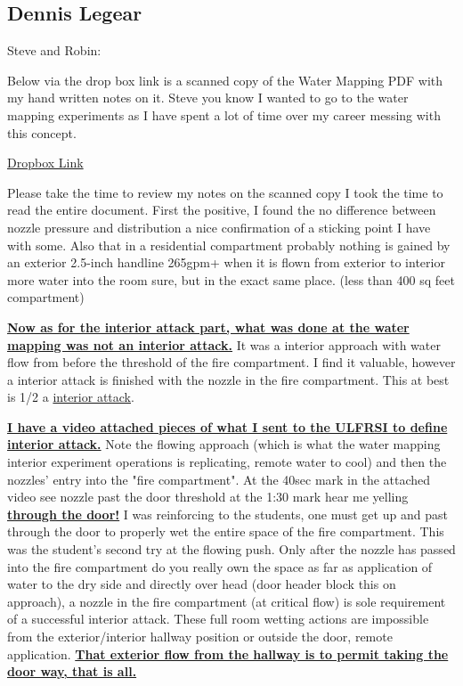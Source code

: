 \documentclass[12pt,oneside]{book}
\begin{document}
\begin{appendix}
\section{Dennis Legear}

Steve and Robin:

Below via the drop box link is a scanned copy of the Water Mapping PDF with my hand written notes on it. Steve you know I wanted to go to the water mapping experiments as I have spent a lot of time over my career messing with this concept.

\hyperlink{https://www.dropbox.com/sh/1wmpqxr2a5fow0c/AAB1bfG-yKjGBKFCOlRtaYDya?dl=0}{Dropbox Link}

Please take the time to review my notes on the scanned copy I took the time to read the entire document.  First the positive, I found the no difference between nozzle pressure and distribution a nice confirmation of a sticking point I have with some.  Also that in a residential compartment probably nothing is gained by an exterior 2.5-inch handline 265gpm+ when it is flown from exterior to interior more water into the room sure, but in the exact same place. (less than 400 sq feet compartment)

\textbf{\ul{Now as for the interior attack part, what was done at the water mapping was not an interior attack.}}  It was a interior approach with water flow from before the threshold of the fire compartment.  I find it valuable, however a interior attack is finished with the nozzle in the fire compartment.  This at best is 1/2 a \ul{interior attack}. 

\textbf{\ul{I have a video attached pieces of what I sent to the ULFRSI to define interior attack.}}  Note the flowing approach (which is what the water mapping interior experiment operations is replicating, remote water to cool) and then the nozzles' entry into the "fire compartment".  At the 40sec mark in the attached video see nozzle past the door threshold at the 1:30 mark hear me yelling \textbf{\ul{through the door!}}  I was reinforcing to the students, one must get up and past through the door to properly wet the entire space of the fire compartment.   This was the student's second try at the flowing push.  Only after the nozzle has passed into the fire compartment do you really own the space as far as application of water to the dry side and directly over head (door header block this on approach), a nozzle in the fire compartment (at critical flow) is sole requirement of a successful interior attack.  These full room wetting actions are impossible from the exterior/interior hallway position or outside the door, remote application.  \textbf{\ul{That exterior flow from the hallway is to permit taking the door way, that is all.}} 


\end{appendix}
\end{document}
